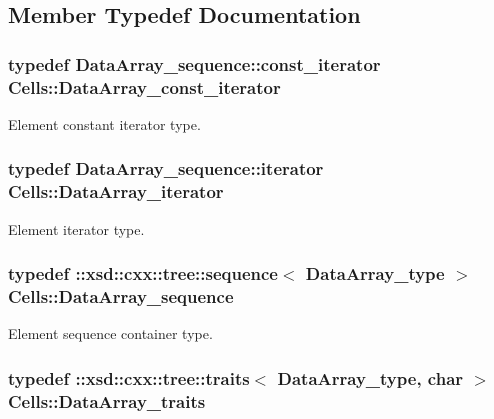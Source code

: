 \subsection{Member Typedef Documentation}
\hypertarget{classCells_ad01c81703074599471cd6159cdea1ac1}{
\subsubsection[{Data\-Array\-\_\-const\-\_\-iterator}]{\setlength{\rightskip}{0pt plus 5cm}typedef Data\-Array\-\_\-sequence\-::const\-\_\-iterator {\bf Cells\-::\-Data\-Array\-\_\-const\-\_\-iterator}}}\label{classCells_ad01c81703074599471cd6159cdea1ac1}


Element constant iterator type. 

\hypertarget{classCells_a1873efdee2bb668676d01a7a5010faa2}{
\subsubsection[{Data\-Array\-\_\-iterator}]{\setlength{\rightskip}{0pt plus 5cm}typedef Data\-Array\-\_\-sequence\-::iterator {\bf Cells\-::\-Data\-Array\-\_\-iterator}}}\label{classCells_a1873efdee2bb668676d01a7a5010faa2}


Element iterator type. 

\hypertarget{classCells_ae2856ec1cc2c6d6a2ccac9de9a22c7b7}{
\subsubsection[{Data\-Array\-\_\-sequence}]{\setlength{\rightskip}{0pt plus 5cm}typedef \-::xsd\-::cxx\-::tree\-::sequence$<$ {\bf Data\-Array\-\_\-type} $>$ {\bf Cells\-::\-Data\-Array\-\_\-sequence}}}\label{classCells_ae2856ec1cc2c6d6a2ccac9de9a22c7b7}


Element sequence container type. 

\hypertarget{classCells_ac35ecebe10914f3d35e85589e998462b}{
\subsubsection[{Data\-Array\-\_\-traits}]{\setlength{\rightskip}{0pt plus 5cm}typedef \-::xsd\-::cxx\-::tree\-::traits$<$ {\bf Data\-Array\-\_\-type}, char $>$ {\bf Cells\-::\-Data\-Array\-\_\-traits}}}\label{classCells_ac35ecebe10914f3d35e85589e998462b}


